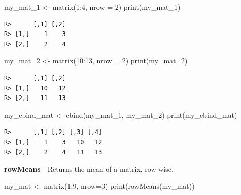 \documentclass[
  12pt,
]{book}
\newenvironment{Shaded}{\begin{snugshade}}{\end{snugshade}}
\newcommand{\AttributeTok}[1]{\textcolor[rgb]{0.61,0.61,0.61}{#1}}
\newcommand{\DecValTok}[1]{\textcolor[rgb]{0.06,0.06,0.06}{#1}}
\newcommand{\FunctionTok}[1]{\textcolor[rgb]{0,0,0}{#1}}
\newcommand{\NormalTok}[1]{#1}
\newcommand{\OtherTok}[1]{\textcolor[rgb]{0.37,0.37,0.37}{#1}}
\newcommand{\SpecialCharTok}[1]{\textcolor[rgb]{0,0,0}{#1}}
\begin{document}
\begin{Shaded}
\begin{Highlighting}[]
\NormalTok{my\_mat\_1 }\OtherTok{\textless{}{-}} \FunctionTok{matrix}\NormalTok{(}\DecValTok{1}\SpecialCharTok{:}\DecValTok{4}\NormalTok{, }\AttributeTok{nrow =} \DecValTok{2}\NormalTok{)}
\FunctionTok{print}\NormalTok{(my\_mat\_1)}
\end{Highlighting}
\end{Shaded}

\begin{verbatim}
R>      [,1] [,2]
R> [1,]    1    3
R> [2,]    2    4
\end{verbatim}

\begin{Shaded}
\begin{Highlighting}[]
\NormalTok{my\_mat\_2 }\OtherTok{\textless{}{-}} \FunctionTok{matrix}\NormalTok{(}\DecValTok{10}\SpecialCharTok{:}\DecValTok{13}\NormalTok{, }\AttributeTok{nrow =} \DecValTok{2}\NormalTok{)}
\FunctionTok{print}\NormalTok{(my\_mat\_2)}
\end{Highlighting}
\end{Shaded}

\begin{verbatim}
R>      [,1] [,2]
R> [1,]   10   12
R> [2,]   11   13
\end{verbatim}

\begin{Shaded}
\begin{Highlighting}[]
\NormalTok{my\_cbind\_mat }\OtherTok{\textless{}{-}} \FunctionTok{cbind}\NormalTok{(my\_mat\_1, my\_mat\_2)}
\FunctionTok{print}\NormalTok{(my\_cbind\_mat)}
\end{Highlighting}
\end{Shaded}

\begin{verbatim}
R>      [,1] [,2] [,3] [,4]
R> [1,]    1    3   10   12
R> [2,]    2    4   11   13
\end{verbatim}

\textbf{rowMeans} - Returns the mean of a matrix, row wise. 

\begin{Shaded}
\begin{Highlighting}[]
\NormalTok{my\_mat }\OtherTok{\textless{}{-}} \FunctionTok{matrix}\NormalTok{(}\DecValTok{1}\SpecialCharTok{:}\DecValTok{9}\NormalTok{, }\AttributeTok{nrow=}\DecValTok{3}\NormalTok{)}
\FunctionTok{print}\NormalTok{(}\FunctionTok{rowMeans}\NormalTok{(my\_mat))}
\end{Highlighting}
\end{Shaded}
\end{document}
